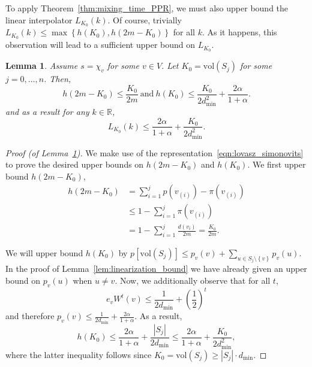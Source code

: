 \documentclass[11pt,twoside]{article}
\newtheorem{lemma}{Lemma}
\newcommand{\set}[1]{\left\{#1\right\}}
\newcommand{\vol}{\mathrm{vol}}
\newcommand{\abs}[1]{\left \lvert #1 \right \rvert}
\newcommand{\Reals}{\mathbb{R}}
\newcommand{\1}{\mathbf{1}}
\begin{document}
To apply Theorem~\ref{thm:mixing_time_PPR}, we must also upper bound the linear interpolator $L_{K_0}(k)$. Of course, trivially $L_{K_0}(k) \leq \max\set{h(K_0), h(2m - K_0)}$ for all $k$. As it happens, this observation will lead to a sufficient upper bound on $L_{K_0}$.
\begin{lemma}
	\label{lem:interpolator_bound}
	Assume $s = \chi_v$ for some $v \in V$. Let $K_0 = \vol(S_j)$ for some $j = 0,\ldots,n$. Then, 
	\begin{equation*}
	h(2m - K_0) \leq \frac{K_0}{2m} ~\mathrm{and}~ h(K_0) \leq \frac{K_0}{2d_{\min}^2} + \frac{2\alpha}{1 + \alpha}.
	\end{equation*}
	and as a result for any $k \in \Reals$,
	\begin{equation*}
	L_{K_0}(k) \leq \frac{2\alpha}{1 + \alpha} + \frac{K_0}{2d_{\min}^2}.
	\end{equation*}
\end{lemma}
\begin{proof}[Proof (of Lemma~\ref{lem:interpolator_bound})]
	We make use of the representation~\eqref{eqn:lovasz_simonovits} to prove the desired upper bounds on $h(2m - K_0)$ and $h(K_0)$. We first upper bound $h(2m - K_0)$,
	\begin{align*}
	h(2m - K_0) & = \sum_{i = 1}^{j} p(v_{(i)}) - \pi(v_{(i)}) \\
	& \leq 1 - \sum_{i = 1}^{j} \pi(v_{(i)}) \\
	& = 1 - \sum_{i = 1}^{j} \frac{d(v_{i})}{2m} = \frac{K_0}{2m}.
	\end{align*}
	
	We will upper bound $h(K_0)$ by $p[\vol(S_j)] \leq p_v(v) + \sum_{u \in S_j \setminus \set{v}}p_v(u)$. In the proof of Lemma~\ref{lem:linearization_bound} we have already given an upper bound on $p_v(u)$ when $u \neq v$. Now, we additionally observe that for all $t$,
	\begin{equation*}
	e_vW^t(v) \leq \frac{1}{2d_{\min}} + \left(\frac{1}{2}\right)^t
	\end{equation*}
	and therefore $p_v(v) \leq \frac{1}{2d_{\min}} + \frac{2\alpha}{1 + \alpha}$.
	As a result,
	\begin{equation}
	h(K_0) \leq \frac{2\alpha}{1 + \alpha} + \frac{\abs{S_j}}{2d_{\min}} \leq \frac{2\alpha}{1 + \alpha} + \frac{K_0}{2d_{\min}^2},
	\end{equation}
	where the latter inequality follows since $K_0 = \vol(S_j) \geq \abs{S_j}\cdot d_{\min}$.
\end{proof}
\end{document}
